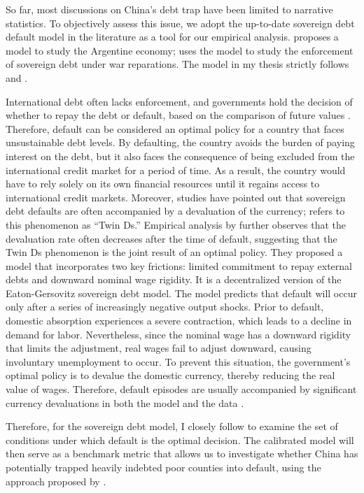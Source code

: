 So far, most discussions on China's debt trap have been limited to narrative statistics.
To objectively assess this issue, we adopt the up-to-date sovereign debt default model in the literature as a tool for our empirical analysis. \citet{Na-18} proposes a model to study the Argentine economy; \citet*{Hinrichsen_2020-chapter4} uses the model to study the enforcement of sovereign debt under war reparations.
The model in my thesis strictly follows \citet{Na-18} and \citet*{Hinrichsen_2020-chapter4}.

International debt often lacks enforcement, and governments hold the decision of whether to repay the debt or default, based on the comparison of future values \citep*{Eaton-Gersovitz-81}. Therefore, default can be considered an optimal policy for a country that faces unsustainable debt levels. By defaulting, the country avoids the burden of paying interest on the debt, but it also faces the consequence of being excluded from the international credit market for a period of time. As a result, the country would have to rely solely on its own financial resources until it regains access to international credit markets.
Moreover, studies have pointed out that sovereign debt defaults are often accompanied by a devaluation of the currency; \citet*{Reinhart02} refers to this phenomenon as ``Twin Ds.''
Empirical analysis by \citet{Na-18} further observes that the devaluation rate often decreases after the time of default, suggesting that the Twin Ds phenomenon is the joint result of an optimal policy.
They proposed a model that incorporates two key frictions: limited commitment to repay external debts and downward nominal wage rigidity.
It is a decentralized version of the Eaton-Gersovitz sovereign debt model.
The model predicts that default will occur only after a series of increasingly negative output shocks. Prior to default, domestic absorption experiences a severe contraction, which leads to a decline in demand for labor. Nevertheless, since the nominal wage has a downward rigidity that limits the adjustment, real wages fail to adjust downward, causing involuntary unemployment to occur. To prevent this situation, the government's optimal policy is to devalue the domestic currency, thereby reducing the real value of wages. Therefore, default episodes are usually accompanied by significant currency devaluations in both the model and the data \citep{Na-18}.

Therefore, for the sovereign debt model, I closely follow \citet{Na-18} to examine the set of conditions under which default is the optimal decision.
The calibrated model will then serve as a benchmark metric that allows us to investigate whether China has potentially trapped heavily indebted poor counties into default, using the approach proposed by \citet*{Hinrichsen_2020-chapter4}.

